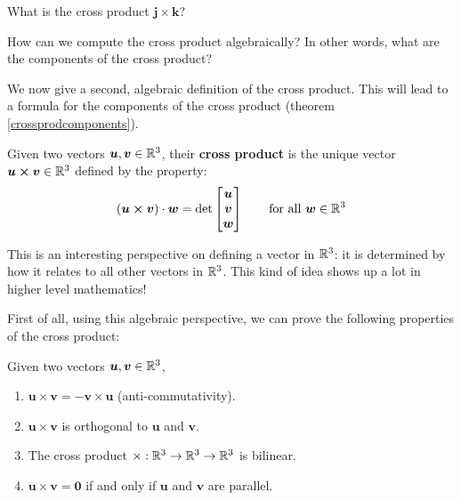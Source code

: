 \begin{example}
    What is the cross product $\bm{j} \times \bm{k}$?
\end{example}

\begin{motivating}
How can we compute the cross product algebraically?  In other words, what are the components of the cross product?
\end{motivating}

We now give a second, algebraic definition of the cross product.  This will lead to a formula for the components of the cross product (theorem \ref{crossprodcomponents}).


\begin{definition}\label{crossproddet}
    Given two vectors $\bm{u}, \bm{v} \in \mathbb{R}^3$, their \textbf{cross product} is the \textnormal{unique} vector $\bm{u \times v} \in \mathbb{R}^3$ defined by the property:
    \begin{equation*}
(\bm{u \times v}) \cdot \bm{w} = \textnormal{det}
\begin{bmatrix}
\bm{u}\\
    \bm{v}  \\
    \bm{w}
\end{bmatrix} \qquad \textnormal{for all } \bm{w} \in \mathbb{R}^3
\end{equation*}
    
    \end{definition}

This is an interesting perspective on defining a vector in $\mathbb{R}^3$: it is determined by how it relates to all other vectors in $\mathbb{R}^3$.  This kind of idea shows up a lot in higher level mathematics!

First of all, using this algebraic perspective, we can prove the following properties of the cross product: 

\begin{theorem}
    
    Given two vectors $\bm{u}, \bm{v} \in \mathbb{R}^3$,
    
    \begin{enumerate}
        \item $\bm{u} \times \bm{v} = - \bm{v} \times \bm{u}$ (anti-commutativity).
        \item $\bm{u} \times \bm{v}$ is orthogonal to $\bm{u}$ and $\bm{v}$.
        \item The cross product $\times : \mathbb{R}^3 \to \mathbb{R}^3 \to \mathbb{R}^3$ is bilinear.
        \item $\bm{u} \times \bm{v} = \bm{0}$ if and only if $\bm{u}$ and $\bm{v}$ are parallel.
    \end{enumerate}
    
    \end{theorem}

